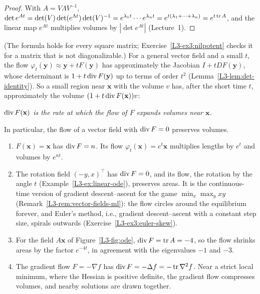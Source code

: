 \begin{proof}
    With $A = V\Lambda V^{-1}$, $\det e^{At} = \det(V)\det(e^{\Lambda t})\det(V)^{-1} = e^{\lambda_1 t}\cdots e^{\lambda_n t} = e^{t(\lambda_1 + \cdots + \lambda_n)} = e^{t\operatorname{tr} A}$, and the linear map $e^{At}$ multiplies volumes by $|\det e^{At}|$ (Lecture~1).
\end{proof}

(The formula holds for every square matrix; Exercise~\ref{L3-ex3:nilpotent} checks it for a matrix that is not diagonalizable.) For a general vector field and a small $t$, the flow $\varphi_t(\mathbf{y}) \approx \mathbf{y} + tF(\mathbf{y})$ has approximately the Jacobian $I + tDF(\mathbf{y})$, whose determinant is $1 + t\operatorname{div} F(\mathbf{y})$ up to terms of order $t^2$ (Lemma~\ref{L3-lem:det-identity}). So a small region near $\mathbf{x}$ with the volume $v$ has, after the short time $t$, approximately the volume $(1 + t\operatorname{div} F(\mathbf{x}))v$:
\begin{center}
    \emph{$\operatorname{div} F(\mathbf{x})$ is the rate at which the flow of $F$ expands volumes near $\mathbf{x}$.}
\end{center}
In particular, the flow of a vector field with $\operatorname{div} F = 0$ preserves volumes.

\begin{example}\label{L3-ex:flow-volumes}
    \begin{enumerate}
        \item $F(\mathbf{x}) = \mathbf{x}$ has $\operatorname{div} F = n$. Its flow $\varphi_t(\mathbf{x}) = e^t\mathbf{x}$ multiplies lengths by $e^t$ and volumes by $e^{nt}$.
        \item The rotation field $(-y, x)^\top$ has $\operatorname{div} F = 0$, and its flow, the rotation by the angle $t$ (Example~\ref{L3-ex:linear-ode}), preserves areas. It is the continuous-time version of gradient descent--ascent for the game $\min_x\max_y xy$ (Remark~\ref{L3-rem:vector-fields-ml}): the flow circles around the equilibrium forever, and Euler's method, i.e., gradient descent--ascent with a constant step size, spirals outwards (Exercise~\ref{L3-ex3:euler-skew}).
        \item For the field $A\mathbf{x}$ of Figure~\ref{L3-fig:ode}, $\operatorname{div} F = \operatorname{tr} A = -4$, so the flow shrinks areas by the factor $e^{-4t}$, in agreement with the eigenvalues $-1$ and $-3$.
        \item The gradient flow $F = -\nabla f$ has $\operatorname{div} F = -\Delta f = -\operatorname{tr}\nabla^2 f$. Near a strict local minimum, where the Hessian is positive definite, the gradient flow compresses volumes, and nearby solutions are drawn together.
    \end{enumerate}
\end{example}

